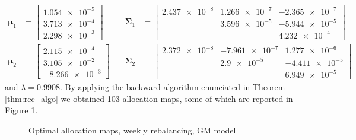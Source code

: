 \begin{align}
\label{eq:GMparam1}
\bm{\mu}_1 & = 
\begin{bmatrix}
\num{1.054e-5} \\
\num{3.713e-4} \\
\num{2.298e-3}
\end{bmatrix}
\quad & \bm{\Sigma}_1 &= 
\begin{bmatrix}
\num{2.437e-8} & \num{1.266e-7} & \num{-2.365e-7} \\
& \num{3.596e-5}  & \num{-5.944e-5} \\
&                & \num{4.232e-4}
\end{bmatrix} \\
\bm{\mu}_2 & = \begin{bmatrix}
\num{2.115e-4} \\
\num{3.105e-2} \\
\num{-8.266e-3}
\end{bmatrix}
\quad & \bm{\Sigma}_2 &= 
\begin{bmatrix}
\num{2.372e-8} & \num{-7.961e-7} & \num{1.277e-6} \\
& \num{2.9e-5}  & \num{-4.411e-5} \\
&                & \num{6.949e-5}
\end{bmatrix}
\label{eq:GMparam2}
\end{align}
and $\lambda = 0.9908$.
By applying the backward algorithm enunciated in Theorem \ref{thm:rec_algo} we obtained 103 allocation maps, some of which are reported in Figure \ref{fig:mapsMixture}.
\begin{figure}[]
	\caption{Optimal allocation maps, weekly rebalancing, GM model}
	\label{fig:mapsMixture}
\end{figure}


